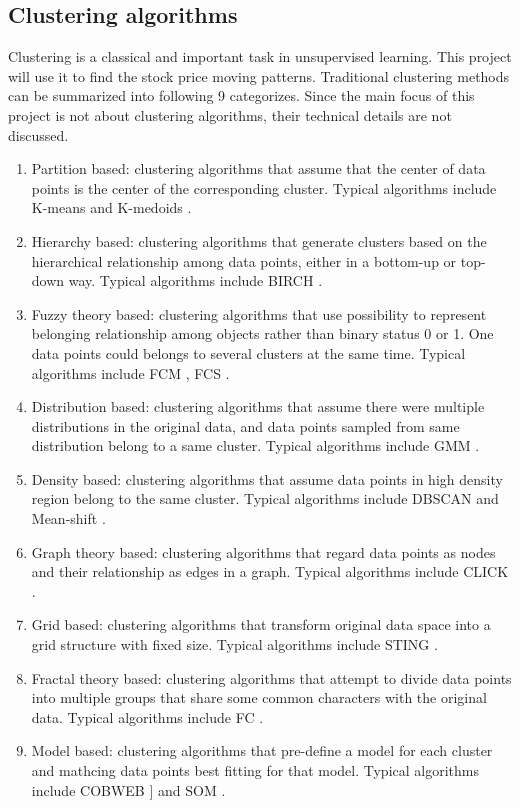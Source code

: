 \subsection{Clustering algorithms}
Clustering is a classical and important task in unsupervised learning. This project will use it to find the stock price moving patterns. Traditional clustering methods can be summarized into following 9 categorizes. Since the main focus of this project is not about clustering algorithms, their technical details are not discussed.
\begin{enumerate}
    \item Partition based: clustering algorithms that assume that the center of data points is the center of the corresponding cluster. Typical algorithms include K-means \cite{macqueen1967some} and K-medoids \cite{park2009simple}.
    \item Hierarchy based: clustering algorithms that generate clusters based on the hierarchical relationship among data points, either in a bottom-up or top-down way. Typical algorithms include BIRCH \cite{zhang1996birch}.
    \item Fuzzy theory based: clustering algorithms that use possibility to represent belonging relationship among objects rather than binary status 0 or 1. One data points could belongs to several clusters at the same time. Typical algorithms include FCM \cite{bezdek1984fcm}, FCS \cite{dave1992adaptive}.
    \item Distribution based: clustering algorithms that assume there were multiple distributions in the original data, and data points sampled from same distribution belong to a same cluster. Typical algorithms include GMM \cite{rasmussen1999infinite}.
    \item Density based: clustering algorithms that assume data points in high density region belong to the same cluster. Typical algorithms include DBSCAN \cite{ester1996density} and Mean-shift \cite{comaniciu2002mean}.
    \item Graph theory based: clustering algorithms that regard data points as nodes and their relationship as edges in a graph. Typical algorithms include CLICK \cite{sharan2000click}.
    \item Grid based: clustering algorithms that transform original data space into a grid structure with fixed size. Typical algorithms include STING \cite{wang1997sting}.
    \item Fractal theory based: clustering algorithms that attempt to divide data points into multiple groups that share some common characters with the original data. Typical algorithms include FC \cite{barbara2000using}.
    \item Model based: clustering algorithms that pre-define a model for each cluster and mathcing data points best fitting for that model. Typical algorithms include COBWEB ]\cite{fisher1987knowledge} and SOM \cite{kohonen1990self}.
\end{enumerate}

